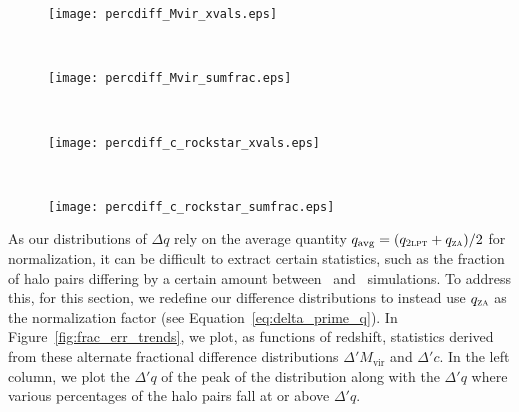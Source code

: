 \begin{figure*}[t]
	\centering
	\begin{subfigure}{}
		\texttt{[image: percdiff\_Mvir\_xvals.eps]}
	\end{subfigure}
	~
	\begin{subfigure}{}
		\texttt{[image: percdiff\_Mvir\_sumfrac.eps]}
	\end{subfigure}
	\\
	\begin{subfigure}{}
		\texttt{[image: percdiff\_c\_rockstar\_xvals.eps]}
	\end{subfigure}
	~
	\begin{subfigure}{}
		\texttt{[image: percdiff\_c\_rockstar\_sumfrac.eps]}
	\end{subfigure}
	\caption[Fractional error distribution statistics as functions of redshift]{\footnotesize Fractional error distributions statistics for $\Delta' M_{\mathrm{vir}}$ (\textit{top row}) and $\Delta' c$ (\textit{bottom row}) as functions of redshift.  \textit{Left column}:  The $\Delta' q$ of the peak of the distribution (black line), and the $\Delta' q$ where 50\% (red dashed line), 10\% (green dashed line), and 1\% (blue dashed line) of the halos fall at or above $\Delta' q$.  As with distributions of $\Delta M_{\mathrm{vir}}$, $\Delta' M_{\mathrm{vir}}$ has the largest positive displacement at high redshift and steadily decreases throughout the simulation.  Additionally, $\Delta' c$ maintains a peak near zero and has a spread much larger than that of $\Delta' M_{\mathrm{vir}}$.  \textit{Right column}:  The fraction of halos with $\Delta' q$ greater than 0.10 (solid blue line), 0.50 (solid green line), 1.00 (solid red line), and 4.00 (solid black line).  The dashed lines additionally count halo pairs with $\Delta' q$ lower than the corresponding equivalent displacements of -0.09, -0.33, -0.50, and -0.80, respectively (see Equation~\ref{eq:equivalent_q_prime}).  We find that 50\% of \lpt\ halos are at least 10\% more massive than their \za\ companions at $z = 15$, reducing to 10\% by $z = 6$.  Halos in \lpt\ are at least twice as concentrated for 12\% of halos at $z = 15$ and 7.8\% of halos at $z = 6$.}
	\label{fig:frac_err_trends}
\end{figure*}

As our distributions of $\Delta q$ rely on the average quantity $q_{\mathrm{avg}} = (q_{\textsc{2lpt}} + q_{\textsc{za}}) / 2$ for normalization, it can be difficult to extract certain statistics, such as the fraction of halo pairs differing by a certain amount between \lpt\ and \za\ simulations.  To address this, for this section, we redefine our difference distributions to instead use $q_{\textsc{za}}$ as the normalization factor (see Equation~\ref{eq:delta_prime_q}).  In Figure~\ref{fig:frac_err_trends}, we plot, as functions of redshift, statistics derived from these alternate fractional difference distributions $\Delta' M_{\mathrm{vir}}$ and $\Delta' c$.  In the left column, we plot the $\Delta' q$ of the peak of the distribution along with the $\Delta' q$ where various percentages of the halo pairs fall at or above $\Delta' q$.

